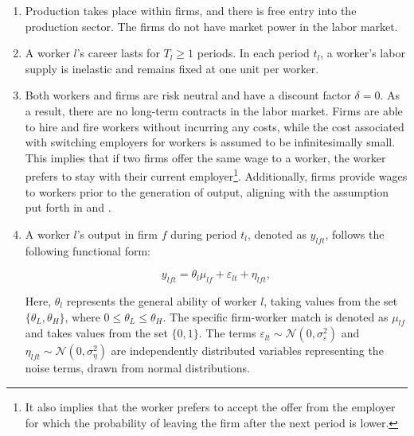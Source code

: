 \documentclass[12pt]{article}
\begin{document}
\begin{enumerate}[label={A}{\arabic*}.]
	\item Production takes place within firms, and there is free entry into the production sector. The firms do not have market power in the labor market.
	\item A worker $l$'s career lasts for $T_l\geq 1$ periods. In each period $t_l$, a worker's labor supply is inelastic and remains fixed at one unit per worker.
	\item Both workers and firms are risk neutral and have a discount factor $\delta = 0$. As a result, there are no long-term contracts in the labor market. Firms are able to hire and fire workers without incurring any costs, while the cost associated with switching employers for workers is assumed to be infinitesimally small. This implies that if two firms offer the same wage to a worker, the worker prefers to stay with their current employer\footnote{It also implies that the worker prefers to accept the offer from the employer for which the probability of leaving the firm after the next period is lower.}. Additionally, firms provide wages to workers prior to the generation of output, aligning with the assumption put forth in \cite{gibbons1999theory} and \cite{ekinci2016employee}.
    \item A worker $l$'s output in firm $f$ during period $t_l$, denoted as $y_{lft}$, follows the following functional form:

        \begin{equation}
        y_{lft} = \theta_l \mu_{lf} + \varepsilon_{lt} + \eta_{lft},
        \end{equation}

    Here, $\theta_l$ represents the general ability of worker $l$, taking values from the set $\{\theta_L, \theta_H\}$, where $0 \leq \theta_L \leq \theta_H$. The specific firm-worker match is denoted as $\mu_{lf}$ and takes values from the set $\{0, 1\}$. The terms $\varepsilon_{lt} \sim \mathcal{N}(0, \sigma^2_{\varepsilon})$ and $\eta_{lft} \sim \mathcal{N}(0, \sigma^2_{\eta})$ are independently distributed variables representing the noise terms, drawn from normal distributions.


\end{enumerate}
\end{document}
